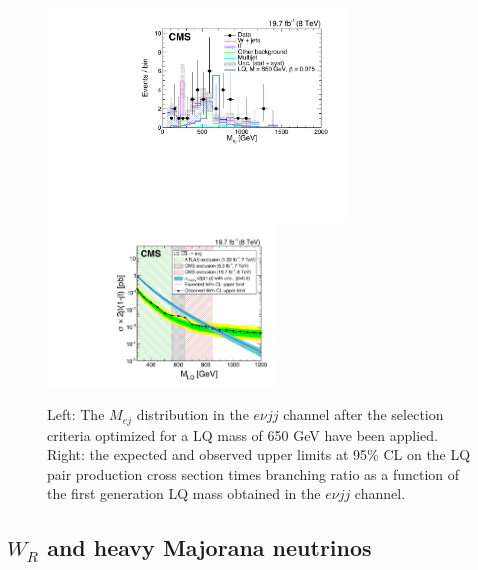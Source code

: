 \documentclass[epj]{webofc}
\begin{document}
\begin{figure}[h]
\centering
\includegraphics[width=8cm,clip]{CMS-EXO-12-041_Figure_009-b.pdf}
\includegraphics[width=6cm,clip]{CMS-EXO-12-041_Figure_010-b.pdf}
\caption{Left: The $M_{ej}$ distribution in the $e\nu jj$ channel after the
  selection criteria optimized for a LQ mass of 650 GeV have been
  applied. Right: the expected and observed upper limits at 95\% CL on
the LQ pair production cross section times branching ratio as a
function of the first generation LQ mass obtained in the $e\nu jj$ channel.}
\label{LQ1}       %
\end{figure}
%

\subsection{$W_R$ and heavy Majorana neutrinos}
\end{document}

